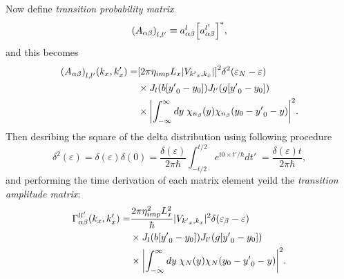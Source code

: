 Now define \textit{transition probability matrix}
\begin{equation} \label{eq_c37}
    \qty(A_{\alpha\beta})_{l,l'} \equiv
    a^l_{\alpha\beta}\qty[a^{l'}_{\alpha\beta}]^{*},
\end{equation}
and this becomes
\begin{equation} \label{eq_c38}
  \begin{aligned}
      \qty(A_{\alpha\beta})_{l,l'}(k_x,k'_x) = &
      \qty[{ 2 \pi \eta_{imp} L_x |V_{{k'}_x,k_x}|}]^2
      \delta^2(\varepsilon_{N} - \varepsilon) \\
      & \times
      J_l\qty(b[{y'}_0 - y_0]) J_{l'}\qty(g[{y'}_0 - y_0])\\
      & \times
      \qty|
      \int_{-\infty}^{\infty} dy \;
      {\chi}_{n_{\beta}}\qty(y)
      {\chi}_{n_{\beta}}\qty(y_0 - {y'}_0 - y)|^2.
  \end{aligned}
\end{equation}
Then desribing the square of the delta distribution using following procedure \cite{dini16,kibis14}
\begin{equation} \label{eq_c39}
    \delta^2(\varepsilon) =
    \delta(\varepsilon)\delta(0) =
    \frac{\delta(\varepsilon)}{2\pi \hbar}
    \int_{-t/2}^{t/2} e^{i0\times t'/\hbar} dt'\; =
    \frac{\delta(\varepsilon)t}{2\pi \hbar},
\end{equation}
and performing the time derivation of each matrix element yeild the \textit{transition amplitude matrix}:
\begin{equation} \label{eq_40}
  \begin{aligned}
    \Gamma_{\alpha\beta}^{ll'}(k_x,k'_x) = &
    \frac { 2\pi \eta_{imp}^2 L_x^2}{ \hbar} |V_{{k'}_x,k_x}|^2
    \delta(\varepsilon_{\beta} - \varepsilon)\\
    & \times
    J_l\qty(b[{y'}_0 - y_0]) J_{l'}\qty(g[{y'}_0 - y_0]) \\
    & \times
    \qty|
    \int_{-\infty}^{\infty} dy \;
    {\chi}_{N}\qty(y)
    {\chi}_{N}\qty(y_0 - {y'}_0 - y)|^2.
  \end{aligned}
\end{equation}

